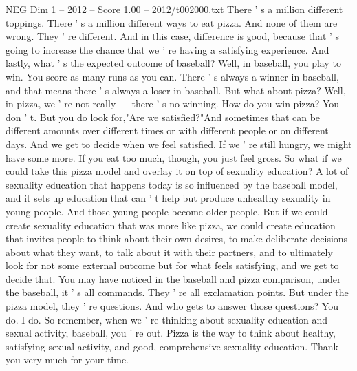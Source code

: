 \begin{textsample}{NEG Dim 1 – 2012 – Score 1.00 – 2012/t002000.txt}
There ' s a million different toppings.
There ' s a million different ways to eat pizza.
And none of them are wrong.
They ' re different.
And in this case, difference is good, because that ' s going to increase the chance that we ' re having a satisfying experience.
And lastly, what ' s the expected outcome of baseball?
Well, in baseball, you play to win.
You score as many runs as you can.
There ' s always a winner in baseball, and that means there ' s always a loser in baseball.
But what about pizza?
Well, in pizza, we ' re not really — there ' s no winning.
How do you win pizza?
You don ' t.
But you do look for,"Are we satisfied?"And sometimes that can be different amounts over different times or with different people or on different days.
And we get to decide when we feel satisfied.
If we ' re still hungry, we might have some more.
If you eat too much, though, you just feel gross.
So what if we could take this pizza model and overlay it on top of sexuality education?
A lot of sexuality education that happens today is so influenced by the baseball model, and it sets up education that can ' t help but produce unhealthy sexuality in young people.
And those young people become older people.
But if we could create sexuality education that was more like pizza, we could create education that invites people to think about their own desires, to make deliberate decisions about what they want, to talk about it with their partners, and to ultimately look for not some external outcome but for what feels satisfying, and we get to decide that.
You may have noticed in the baseball and pizza comparison, under the baseball, it ' s all commands.
They ' re all exclamation points.
But under the pizza model, they ' re questions.
And who gets to answer those questions?
You do.
I do.
So remember, when we ' re thinking about sexuality education and sexual activity, baseball, you ' re out.
Pizza is the way to think about healthy, satisfying sexual activity, and good, comprehensive sexuality education.
Thank you very much for your time.

\end{textsample}
